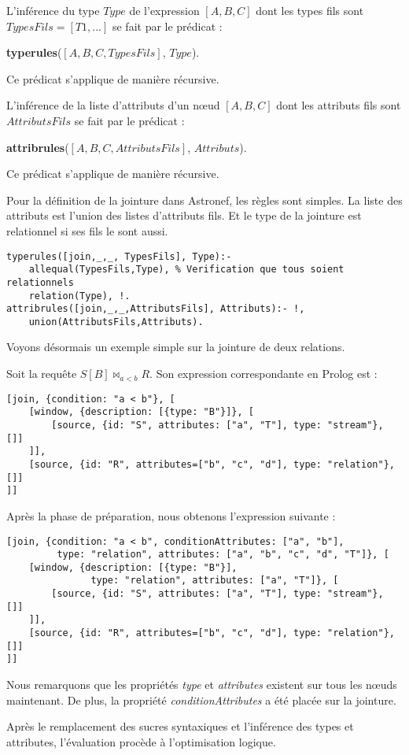 \begin{regle}
L'inférence du type $Type$ de l'expression $[A,B,C]$ dont les types fils sont $TypesFils=[T1,...]$ se fait par le prédicat :
\begin{center} \textbf{typerules}($[A,B,C,TypesFils]$, $Type$).\end{center}
Ce prédicat s'applique de manière récursive.
\end{regle}

\begin{regle}
L'inférence de la liste d'attributs d'un nœud $[A,B,C]$ dont les attributs fils sont $AttributsFils$ se fait par le prédicat :
\begin{center} \textbf{attribrules}($[A,B,C,AttributsFils]$, $Attributs$).\end{center}
Ce prédicat s'applique de manière récursive.
\end{regle}

\begin{example}
	Pour la définition de la jointure dans Astronef, les règles sont simples. La liste des attributs est l'union des listes d'attributs fils. Et le type de la jointure est relationnel si ses fils le sont aussi.
	\begin{lstlisting}
typerules([join,_,_, TypesFils], Type):- 
	allequal(TypesFils,Type), % Verification que tous soient relationnels 
	relation(Type), !.
attribrules([join,_,_,AttributsFils], Attributs):- !, 
	union(AttributsFils,Attributs).
	\end{lstlisting}
\end{example}

Voyons désormais un exemple simple sur la jointure de deux relations.
\begin{example}
	Soit la requête $S[B] \Join_{a < b} R$. Son expression correspondante en Prolog est :
	\begin{lstlisting}
[join, {condition: "a < b"}, [
	[window, {description: [{type: "B"}]}, [
		[source, {id: "S", attributes: ["a", "T"], type: "stream"}, []]
	]],
	[source, {id: "R", attributes=["b", "c", "d"], type: "relation"}, []]
]]
	\end{lstlisting}
	Après la phase de préparation, nous obtenons l'expression suivante :
	\begin{lstlisting}
[join, {condition: "a < b", conditionAttributes: ["a", "b"], 
		 type: "relation", attributes: ["a", "b", "c", "d", "T"]}, [
	[window, {description: [{type: "B"}], 
			   type: "relation", attributes: ["a", "T"]}, [
		[source, {id: "S", attributes: ["a", "T"], type: "stream"}, []]
	]],
	[source, {id: "R", attributes=["b", "c", "d"], type: "relation"}, []]
]]
	\end{lstlisting}
	Nous remarquons que les propriétés \textit{type} et \textit{attributes} existent sur tous les nœuds maintenant. De plus, la propriété \textit{conditionAttributes} a été placée sur la jointure.
\end{example}
Après le remplacement des sucres syntaxiques et l'inférence des types et attributes, l'évaluation procède à l'optimisation logique.
